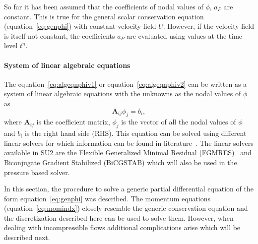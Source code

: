 So far it has been assumed that the coefficients of nodal values of $\phi$, $a_P$ are constant. This is true for the general scalar conservation equation (equation~\ref{eq:genphi}) with constant velocity field $U$. However, if the velocity field is itself not constant, the coefficients $a_P$ are evaluated using values at the time level $t^n$. 

\paragraph{System of linear algebraic equations}
The equation~\ref{eq:algeqnphiv1} or equation~\ref{eq:algeqnphiv2} can be written as a system of linear algebraic equations with the unknowns as the nodal values of $\phi$ as
\begin{equation}
\mathbf{A}_{ij}\phi_j = b_i,
\end{equation}
where $\mathbf{A}_{ij}$ is the coefficient matrix, $\phi_j$ is the vector of all the nodal values of $\phi$ and $b_i$ is the right hand side (RHS).
This equation can be solved using different linear solvers for which information can be found in literature~\cite{Moukalled,Ferziger2002,van2003iterative, strang1993introduction, saad1986gmres}. The linear solvers available in SU2 are the Flexible Generalized Minimal Residual (FGMRES)~\cite{saad1986gmres} and Biconjugate Gradient Stabilized (BiCGSTAB)\cite{van2003iterative, strang1993introduction, saad1986gmres} which will also be used in the pressure based solver.

In this section, the procedure to solve a generic partial differential equation of the form equation~\ref{eq:genphi} was described. The momentum equations (equation~\ref{eq:momindx}) closely resemble the generic conservation equation and the discretization described here can be used to solve them. However, when dealing with incompressible flows additional complications arise which will be described next.

